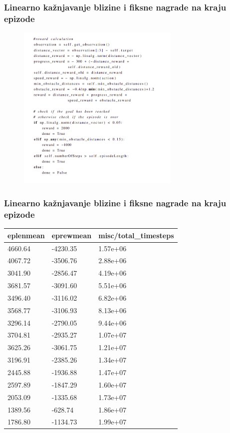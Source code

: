 \documentclass{beamer}
\begin{document}
\begin{frame}
	\frametitle{Linearno kažnjavanje blizine i fiksne nagrade na kraju epizode}

	\begin{figure}[h!]
		\centering
		\includegraphics[height=8cm]{img/fix.png}
	\end{figure}

\end{frame}

\begin{frame}
	\frametitle{Linearno kažnjavanje blizine i fiksne nagrade na kraju epizode}

	\begin{table}[ht!]
		\centering
		\label{tab:rub}
		\begin{tabular}{@{}lll@{}}
			\hline
			eplenmean & eprewmean & misc/total\_timesteps \\
			\hline
			\hline
			4660.64   & -4230.35  & 1.57e+06              \\
			4067.72   & -3506.76  & 2.88e+06              \\
			3041.90   & -2856.47  & 4.19e+06              \\
			3681.57   & -3091.60  & 5.51e+06              \\
			3496.40   & -3116.02  & 6.82e+06              \\
			3568.77   & -3106.93  & 8.13e+06              \\
			3296.14   & -2790.05  & 9.44e+06              \\
			3704.81   & -2935.27  & 1.07e+07              \\
			3625.26   & -3061.75  & 1.21e+07              \\
			3196.91   & -2385.26  & 1.34e+07              \\
			2445.88   & -1936.88  & 1.47e+07              \\
			2597.89   & -1847.29  & 1.60e+07              \\
			2053.09   & -1335.68  & 1.73e+07              \\
			1389.56   & -628.74   & 1.86e+07              \\
			1786.80   & -1134.73  & 1.99e+07              \\
			\hline
		\end{tabular}
	\end{table}

\end{frame}
\end{document}
